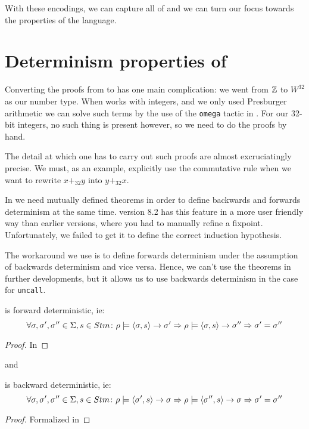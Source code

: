 With these encodings, we can capture all of \januso{} and we can turn
our focus towards the properties of the language.

\section{Determinism properties of \januso{}}

Converting the proofs from \janusz{} to \januso{} has one main
complication: we went from $\mathbb{Z}$ to $W^{32}$ as our number type. When
\coq{} works with integers, and we only used Presburger arithmetic we
can solve such terms by the use of the \texttt{omega} tactic in
\coq{}. For our 32-bit integers, no such thing is present however, so
we need to do the proofs by hand.

The detail at which one has to carry out such proofs are almost
excruciatingly precise. We must, as an example, explicitly use the
commutative rule when we want to rewrite $x +_{32} y$ into $y +_{32}
x$.

In \coq{} we need mutually defined theorems in order to define
backwards and forwards determinism at the same time. \coq{} version
8.2 has this feature in a more user friendly way than earlier
versions, where you had to manually refine a fixpoint. Unfortunately,
we failed to get it to define the correct induction hypothesis.

The workaround we use is to define forwards determinism under the
assumption of backwards determinism and vice versa. Hence, we can't
use the theorems in further developments, but it allows us to use
backwards determinism in the case for \texttt{uncall}.

\begin{thm}
\label{thm:j1-fwd-det}
  \januso{} is forward deterministic, ie:
  \begin{equation*}
    \forall \sigma, \sigma', \sigma'' \in \Sigma, s \in Stm \colon
    \rho |= \langle \sigma, s \rangle -> \sigma' => \rho |= \langle \sigma, s \rangle -> \sigma'' => \sigma' = \sigma''
  \end{equation*}
\end{thm}
\begin{proof}
  In \coq{}
\end{proof}
and
\begin{thm}
\label{thm:j1-bwd-det}
  \januso{} is backward deterministic, ie:
  \begin{equation*}
    \forall \sigma, \sigma', \sigma'' \in \Sigma, s \in Stm \colon
    \rho |= \langle \sigma', s \rangle -> \sigma => \rho |= \langle \sigma'', s \rangle -> \sigma => \sigma' = \sigma''
  \end{equation*}
\end{thm}
\begin{proof}
  Formalized in \coq{}
\end{proof}

